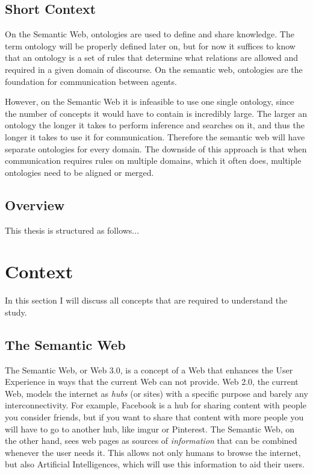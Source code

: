 \documentclass{article}
\begin{document}
 \subsection{Short Context}
 On the Semantic Web, ontologies are used to define and share knowledge. The term ontology will be properly defined later on, but for now it suffices to know that an ontology is a set of rules that determine what relations are allowed and required in a given domain of discourse. On the semantic web, ontologies are the foundation for communication between agents.
 
 However, on the Semantic Web it is infeasible to use one single ontology, since the number of concepts it would have to contain is incredibly large. The larger an ontology the longer it takes to perform inference and searches on it, and thus the longer it takes to use it for communication. Therefore the semantic web will have separate ontologies for every domain. The downside of this approach is that when communication requires rules on multiple domains, which it often does, multiple ontologies need to be aligned or merged.
 
 
 \subsection{Overview}
 This thesis is structured as follows...
 
\section{Context}
 In this section I will discuss all concepts that are required to understand the study.
 \subsection{The Semantic Web}
 The Semantic Web, or Web 3.0, is a concept of a Web that enhances the User Experience in ways that the current Web can not provide. Web 2.0, the current Web, models the internet as \textit{hubs} (or sites) with a specific purpose and barely any interconnectivity. For example, Facebook is a hub for sharing content with people you consider friends, but if you want to share that content with more people you will have to go to another hub, like imgur or Pinterest.
The Semantic Web, on the other hand, sees web pages as sources of \textit{information} that can be combined whenever the user needs it. This allows not only humans to browse the internet, but also Artificial Intelligences, which will use this information to aid their users.
\end{document}
